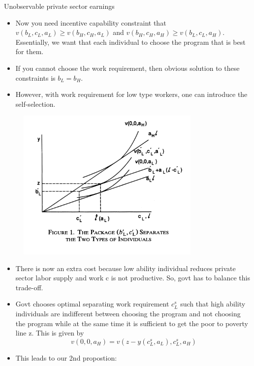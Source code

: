 \documentclass{beamer}
\begin{document}
\begin{frame}[allowframebreaks]{Unobservable private sector earnings }
\begin{itemize}
    \item Now you need incentive capability constraint that $v(b_L,c_L,a_L) \geq v(b_H,c_H,a_L) $ and $v(b_H,c_H,a_H) \geq v(b_L,c_L,a_H)$. Essentially, we want that each individual to choose the program that is best for them.
    \item If you cannot choose the work requirement, then obvious solution to these constraints is $b_L = b_H$. 
    \item However, with work requirement for low type workers, one can introduce the self-selection. 
\end{itemize}



\begin{figure}  
\includegraphics[width=0.8\textwidth]{F1.png}
\end{figure}    

\begin{itemize}
    \item There is now an extra cost because low ability individual reduces private sector labor supply and work c is not productive. So, govt has to balance this trade-off. 
    \item Govt chooses optimal separating work requirement $c^s_L$ such that high ability individuals are indifferent between choosing the program and not choosing the program while at the same time it is sufficient to get the poor to poverty line z. This is given by 
    \[v(0,0,a_H) = v(z-y(c^s_L , a_L), c^s_L,a_H)\]

\item This leads to our 2nd propostion: 


\end{itemize}
\end{frame}
\end{document}
